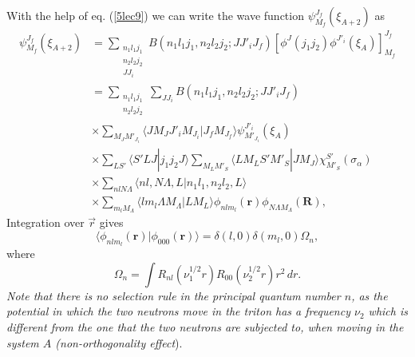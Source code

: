 With the help of eq. (\ref{5lec9}) we can write the wave function $\psi_{M_f}^{J_f}(\xi_{A+2})$ as
\begin{equation}\label{5lec11}
\begin{split}
\psi_{M_f}^{J_f}(\xi_{A+2})&= \sum_{\substack{n_1 l_1 j_1\\n_2 l_2 j_2\\ J J_i}} B(n_1 l_1 j_1,n_2 l_2 j_2;JJ'_i J_f)
\left[ \phi^J(j_1 j_2) \phi^{J'_i}(\xi_A)\right]^{J_f}_{M_f}\\
&= \sum_{\substack{n_1 l_1 j_1\\n_2 l_2 j_2}} \sum_{J J_i }B(n_1 l_1 j_1,n_2 l_2 j_2;JJ'_i J_f)\\
& \times \sum_{M_J M'_{J_i}} \langle J M_J J'_i M_{J_i}|J_f M_{J_f}\rangle \psi_{M'_{J_i}}^{J'_i}(\xi_{A})\\
& \times \sum_{L S'} \langle S' L J |j_1 j_2 J \rangle \sum_{M_L M'_S} \langle L M_L S' M'_S |J M_J  \rangle \chi^{S'}_{M'_S}(\sigma_\alpha)\\
& \times \sum_{n l N \Lambda} \langle n l,N \Lambda, L |n_1 l_1,n_2 l_2, L \rangle \\
& \times \sum_{m_l  M_\Lambda}
\langle l m_l \Lambda M_\Lambda |L M_L \rangle \phi_{n l m_l}(\mathbf r) \phi_{N \Lambda M_\Lambda}(\mathbf R),
\end{split}
\end{equation}
Integration over $\vec r$ gives
\begin{equation}\label{5lec12}
\langle \phi_{n l m_l}(\mathbf r) | \phi_{000}(\mathbf r) \rangle = \delta(l,0) \delta(m_l,0) \Omega_n,
\end{equation}
where
\begin{equation}\label{5lec13}
\Omega_n=\int R_{n l} (\nu_1^{1/2} r)R_{00} (\nu_2^{1/2} r) r^2\, dr.
\end{equation}
\textit{Note that there is no selection rule in the principal quantum number $n$, as the potential in which the two neutrons move in the triton has a frequency $\nu_2$ which is different from the one that the two neutrons are subjected to, when moving in the system $A$ (non-orthogonality effect}).



